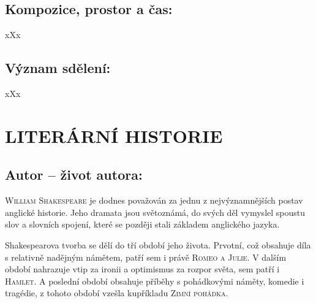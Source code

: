 \documentclass[A4paper]{extarticle} %
\begin{document}
\subsection*{Kompozice, prostor a čas:}
\noindent 
xXx

\subsection*{Význam sdělení:}
\noindent 
xXx

\section*{LITERÁRNÍ HISTORIE}





\subsection*{Autor {\ssmall -- život autora:}}
\noindent 
\textsc{William Shakespeare} je dodnes považován za jednu z nejvýznamnějších postav anglické historie.
Jeho dramata jsou světoznámá, do svých děl vymyslel spoustu slov a slovních spojení, které se později stali základem anglického jazyka. \par
Shakespearova tvorba se dělí do tří období jeho života.
Prvotní, což obsahuje díla s relativně nadějným námětem, patří sem i právě \textsc{Romeo a Julie}.
V dalším období nahrazuje vtip za ironii a optimismus za rozpor světa, sem patří i \textsc{Hamlet}.
A poslední období obsahuje příběhy s pohádkovými náměty, komedie i tragédie, z tohoto období vzešla kupříkladu \textsc{Zimní pohádka}.
\end{document}
